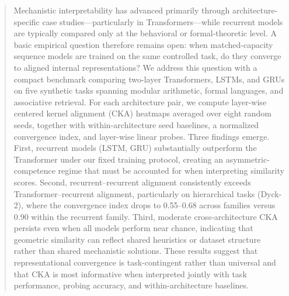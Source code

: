 \documentclass{article}
\begin{document}

\printAffiliationsAndNotice{}

\begin{abstract}
Mechanistic interpretability has advanced primarily through 
architecture-specific case studies---particularly in 
Transformers---while recurrent models are typically compared only 
at the behavioral or formal-theoretic level. A basic empirical 
question therefore remains open: when matched-capacity sequence 
models are trained on the same controlled task, do they converge 
to aligned internal representations? We address this question 
with a compact benchmark comparing two-layer Transformers, LSTMs, 
and GRUs on five synthetic tasks spanning modular arithmetic, 
formal languages, and associative retrieval. For each 
architecture pair, we compute layer-wise centered kernel alignment 
(CKA) heatmaps averaged over eight random seeds, together with 
within-architecture seed baselines, a normalized convergence 
index, and layer-wise linear probes. Three findings emerge. 
First, recurrent models (LSTM, GRU) substantially outperform the 
Transformer under our fixed training protocol, creating an 
asymmetric-competence regime that must be accounted for when 
interpreting similarity scores. Second, recurrent--recurrent 
alignment consistently exceeds Transformer--recurrent alignment, 
particularly on hierarchical tasks (Dyck-2), where the 
convergence index drops to 0.55--0.68 across families versus 0.90 
within the recurrent family. Third, moderate cross-architecture 
CKA persists even when all models perform near chance, indicating 
that geometric similarity can reflect shared heuristics or dataset 
structure rather than shared mechanistic solutions. These results 
suggest that representational convergence is task-contingent 
rather than universal and that CKA is most informative when 
interpreted jointly with task performance, probing accuracy, and 
within-architecture baselines.
\end{abstract}
\end{document}
